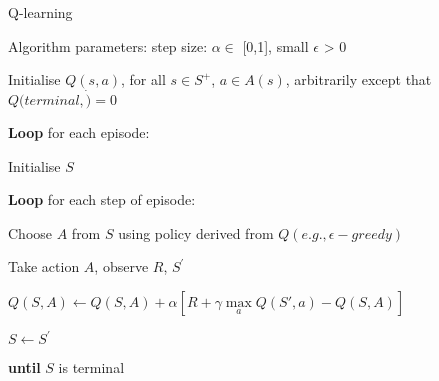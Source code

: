 \documentclass[../Head/Main.tex]{subfiles}
\begin{document}
\begin{Pseudo}{Q-learning}{}
\begin{Indentation}
    \item Algorithm parameters: step size: $\alpha\in$ [0,1], small  $\epsilon$ > 0 \vspace{-2pt}
    \item Initialise $Q(s,a)$, for all $s\in S^{+}$, $a\in A(s)$, arbitrarily except that $Q(terminal,\dot)=0$
    \item \textbf{Loop} for each episode: \vspace{-2pt}
    \begin{Indentation}
        \item Initialise $S$ \vspace{-2pt}
        \item \textbf{Loop} for each step of episode: \vspace{-2pt}
        \begin{Indentation}
            \item Choose $A$ from $S$ using policy derived from $Q(e.g., \epsilon-greedy)$ \vspace{-2pt}
            \item Take action $A$, observe $R$, $S^{'}$ \vspace{-1pt}
            \item $Q(S,A) \leftarrow Q(S,A) + \alpha \left[R + \gamma \max\limits_{a} Q(S',a) - Q(S,A)\right]$
            \item $S\leftarrow S^{'}$ \vspace{-2pt}
        \end{Indentation}
        \item \textbf{until} $S$ is terminal 
    \end{Indentation}
\end{Indentation}
\end{Pseudo}
\end{document}
